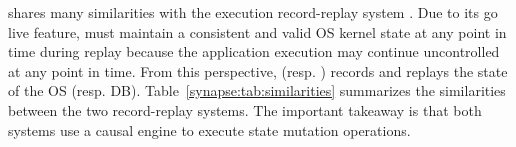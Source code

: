 \synapse shares many similarities with the execution record-replay system \scribe.
Due to its go live feature, \scribe must maintain a consistent and valid OS
kernel state at any point in time during replay because the application
execution may continue uncontrolled at any point in time.
From this perspective, \scribe (resp. \synapse) records and replays the state of
the OS (resp. DB).
Table~\ref{synapse:tab:similarities} summarizes the similarities between the
two record-replay systems. The important takeaway is that both systems use a
causal engine to execute state mutation operations.

\begin{table}[t]
 \caption{{\small {\bf Similarities between \scribe and \synapse }}
 Each row depicts the equivalent entity with \scribe and \synapse.}
 \label{synapse:tab:similarities}
\end{table}


